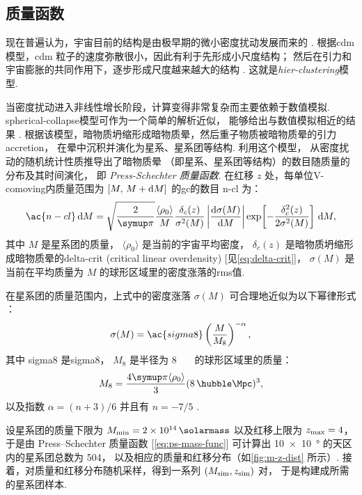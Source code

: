 \subsection{质量函数}
\label{sec:mass-function}

现在普遍认为，宇宙目前的结构是由极早期的微小密度扰动发展而来的 \cite{peebles1980}.
根据\acf{cdm} 模型，\ac{cdm} 粒子的速度弥散很小，因此有利于先形成小尺度结构；
然后在引力和宇宙膨胀的共同作用下，逐步形成尺度越来越大的结构
\cite{davis1985,bond1991,lacey1993}.
这就是\emph{\acf{hier-clustering}}模型.

当密度扰动进入非线性增长阶段，计算变得非常复杂而主要依赖于数值模拟.
\ac{spherical-collapse}模型可作为一个简单的解析近似，
能够给出与数值模拟相近的结果 \cite{gunn1972}.
根据该模型，暗物质坍缩形成暗物质晕，然后重子物质被暗物质晕的引力\ac{accretion}，
在晕中沉积并演化为星系、星系团等结构.
利用这个模型， 从密度扰动的随机统计性质推导出了暗物质晕
（即星系、星系团等结构）的数目随质量的分布及其时间演化，
即 \emph{Press-Schechter 质量函数}.
在红移 $z$ 处，每单位\ac{V-comoving}内质量范围为 $[M,\, M+\mathrm{d}M]$
的\ac{gc}的数目 \ac{n-cl} 为：
\begin{equation}
  \label{eq:ps-mass-func}
  \ac{n-cl} \,\D{M} =
    \sqrt{\frac{2}{\Cpi}} \frac{\langle \rho_0 \rangle}{M}
    \frac{\delta_c(z)}{\sigma^2(M)} \left| \diff{\sigma(M)}{M} \right|
    \exp\!\left[ -\frac{\delta_c^2(z)}{2\sigma^2(M)} \right] \,\D{M} ,
\end{equation}
其中
$M$ 是星系团的质量，
$\langle \rho_0 \rangle$ 是当前的宇宙平均密度，
$\delta_c(z)$ 是暗物质坍缩形成暗物质晕的\acl{delta-crit}
(critical linear overdensity) [见\autoref{eq:delta-crit}]，
$\sigma(M)$ 是当前在平均质量为 $M$ 的球形区域里的密度涨落的\ac{rms}值.

在星系团的质量范围内，上式中的密度涨落 $\sigma(M)$ 可合理地近似为以下幂律形式
\cite{sarazin2002,randall2002}：
\begin{equation}
  \label{eq:sigma-mass}
  \sigma(M) = \ac{sigma8} \left( \frac{M}{M_8} \right)^{-\alpha} ,
\end{equation}
其中
\ac{sigma8} 是\acl{sigma8}，
$M_8$ 是半径为 \SI{8}{\per\hubble\Mpc} 的球形区域里的质量：
\begin{equation}
  M_8 = \frac{4\Cpi \langle \rho_0 \rangle}{3}
    (\SI{8}{\per\hubble\Mpc})^3 ,
\end{equation}
以及指数 $\alpha = (n+3)/6$ 并且有 $n = -7/5$ \cite{bahcall1998}.

设星系团的质量下限为 $M_{\R{min}} = \SI{2e14}{\solarmass}$
以及红移上限为 $z_{\mathrm{max}} = 4$，
于是由 Press--Schechter 质量函数 [\autoref{eq:ps-mass-func}]
可计算出 \SI{10 x 10}{\degree} 的天区内的星系团总数为 504，
以及相应的质量和红移分布（如\autoref{fig:m-z-dist} 所示）.
接着，对质量和红移分布随机采样，得到一系列 $(M_{\mathrm{sim}}, z_{\mathrm{sim}})$ 对，
于是构建成所需的星系团样本.

